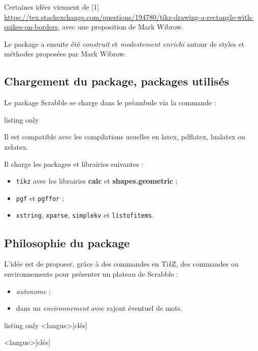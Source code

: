 \documentclass{article}
\providecommand\tikzlogo{Ti\textit{k}Z}
\let\TikZ\tikzlogo
\newcommand\Cle[1]{{\bfseries\sffamily\textlangle #1\textrangle}}
\begin{document}
Certaines idées viennent de \scalebox{0.75}[1]{\ttfamily\url{ https://tex.stackexchange.com/questions/194780/tikz-drawing-a-rectangle-with-spikes-on-borders}}, avec une proposition de Mark Wibrow.

\smallskip

Le package a ensuite été \textit{construit} et \textit{modestement enrichi} autour de styles et méthodes proposées par Mark Wibrow.

\subsection{Chargement du package, packages utilisés}

Le package \textsf{Scrabble} se charge dans le préambule via la commande :

\begin{PresentationCode}{listing only}
\usepackage{Scrabble}
\end{PresentationCode}

Il est compatible avec les compilations usuelles en \textsf{latex}, \textsf{pdflatex}, \textsf{lualatex} ou \textsf{xelatex}.

\medskip

Il charge les packages et librairies suivantes :

\begin{itemize}
	\item \texttt{tikz} avec les librairies \Cle{calc} et \Cle{shapes.geometric} ;
	\item \texttt{pgf} et \texttt{pgffor} ;
	\item \texttt{xstring}, \texttt{xparse}, \texttt{simplekv} et \texttt{listofitems}.
\end{itemize}

\subsection{\og Philosophie \fg{} du package}

L'idée est de proposer, grâce à des commandes en \TikZ, des \textsf{commandes} ou \textsf{environnements} pour présenter un plateau de Scrabble\texttrademark{} :

\begin{itemize}
	\item \textit{autonome} ;
	\item dans un \textit{environnement} avec rajout éventuel de mots.
\end{itemize}

\begin{PresentationCode}{listing only}
\PlateauScrabble<langue>[clés]

\begin{EnvScrabbleFR}<langue>[clés]
\end{EnvScrabbleFR}
\end{PresentationCode}
\end{document}
